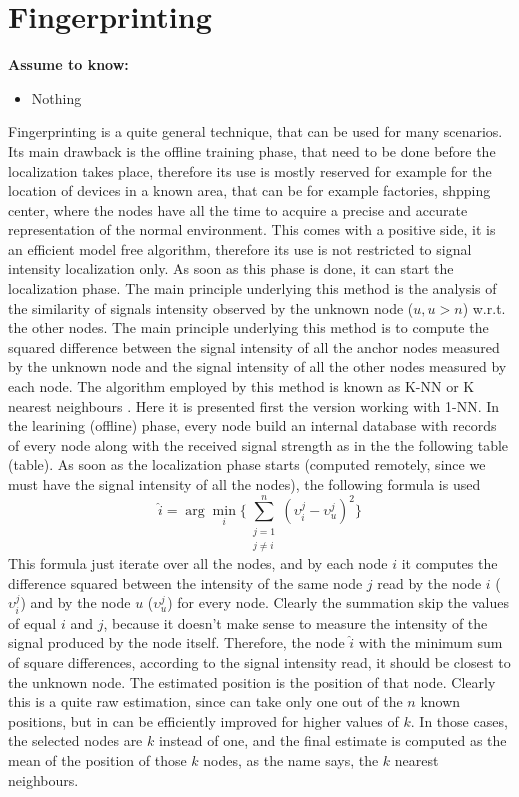 \documentclass[12pt,twoside]{report}
\begin{document}
\section{Fingerprinting}
  \begin{center}
  \textbf{Assume to know:}
  \begin{itemize}
    \centering
    \item Nothing
  \end{itemize}
  \end{center}
Fingerprinting \cite{YIU2017235} is a quite general technique, that can be used for many scenarios. Its main drawback is the offline training phase, that need to be done before the localization takes place, therefore its use is mostly reserved for example for the location of devices in a known area, that can be for example factories, shpping center, where the nodes have all the time to acquire a precise and accurate representation of the normal environment. This comes with a positive side, it is an efficient model free algorithm, therefore its use is not restricted to signal intensity localization only. As soon as this phase is done, it can start the localization phase. The main principle underlying this method is the analysis of the similarity of signals intensity observed by the unknown node ($u,u>n$) w.r.t. the other nodes. The main principle underlying this method is to compute the squared difference between the signal intensity of all the anchor nodes measured by the unknown node and the signal intensity of all the other nodes measured by each node.
The algorithm employed by this method is known as K-NN or K nearest neighbours \cite{10.5555/1162264}. Here it is presented first the version working with 1-NN.
In the learining (offline) phase, every node build an internal database with records of every node along with the received signal strength as in the the following table (table). As soon as the localization phase starts (computed remotely, since we must have the signal intensity of all the nodes), the following formula is used
\begin{equation}
    \hat{i}=\arg \min_i\bigg\{\sum_{\substack{j=1\\j\neq i}}^n(\upsilon_i^j-\upsilon_{u}^j)^2\bigg\}
\end{equation}
This formula just iterate over all the nodes, and by each node $i$ it computes the difference squared between the intensity of the same node $j$ read by the node $i$ ($\upsilon_i^j$) and by the node $u$ ($\upsilon_u^j$) for every node. Clearly the summation skip the values of equal $i$ and $j$, because it doesn't make sense to measure the intensity of the signal produced by the node itself. Therefore, the node $\hat{i}$ with the minimum sum of square differences, according to the signal intensity read, it should be closest to the unknown node. The estimated position is the position of that node. Clearly this is a quite raw estimation, since can take only one out of the $n$ known positions, but in can be efficiently improved for higher values of $k$. In those cases, the selected nodes are $k$ instead of one, and the final estimate is computed as the mean of the position of those $k$ nodes, as the name says, the $k$ nearest neighbours.
\end{document}
